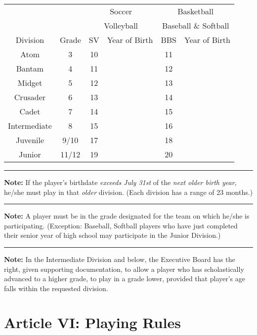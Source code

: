 \documentclass[letteraper,10pt,oneside,draft]{memoir}
\begin{document}
\begin{center}
    \begin{tabular}{|c|c|c|c|c|c|}
        \hline
         & & \multicolumn{2}{c|}{Soccer} & \multicolumn{2}{c|}{Basketball} \\
         & & \multicolumn{2}{c|}{Volleyball} & \multicolumn{2}{c|}{Baseball \& Softball} \\
         \hline
         Division & Grade & SV & Year of Birth & BBS & Year of Birth \\
         \hline
         Atom & 3 & 10 & & 11 & \\
         \hline
         Bantam & 4 & 11 & & 12 & \\
         \hline
         Midget & 5 & 12 & & 13 & \\
         \hline
         Crusader & 6 & 13 & & 14 & \\
         \hline
         Cadet & 7 & 14 & & 15 & \\
         \hline
         Intermediate & 8 & 15 & & 16 & \\
         \hline
         Juvenile & 9/10 & 17 & & 18 & \\
         \hline
         Junior & 11/12 & 19 & & 20 & \\
         \hline
    \end{tabular}
\end{center}
\plainbreak{1}
\textbf{Note:}  If the player’s birthdate {\em exceeds July 31st} of the {\em next older birth year,} he/she must play in that {\em older} division. (Each division has a range of 23 months.)
\plainbreak{1}
\textbf{Note:}  A player must be in the grade designated for the team on which he/she is participating.  (Exception: Baseball, Softball players who have just completed their senior year of high school may participate in the Junior Division.)
\plainbreak{1}
\textbf{Note:} In the Intermediate Division and below, the Executive Board has the right, given supporting documentation, to allow a player who has scholastically advanced to a higher grade, to play in a grade lower, provided that player’s age falls within the requested division.

\section{Article VI: Playing Rules}
\label{sec:const-6}
\end{document}
